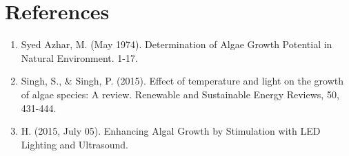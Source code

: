 \documentclass[12pt,a4paper]{IEEEtran}
\begin{document}
    \section{References}
    \begin{enumerate}
    	\item Syed Azhar, M. (May 1974). Determination of Algae Growth Potential in Natural Environment. 1-17.
    	\item Singh, S., \& Singh, P. (2015). Effect of temperature and light on the growth of algae species: A review. Renewable and Sustainable Energy Reviews, 50, 431-444.
    	\item H. (2015, July 05). Enhancing Algal Growth by Stimulation with LED Lighting and Ultrasound.
    \end{enumerate}
    
\end{document}
